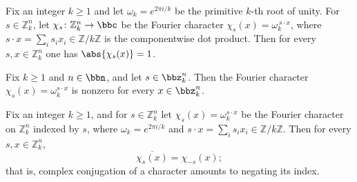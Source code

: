\begin{lemma}
\label{ZkFourier.norm_char_s}
\leanok
{}
Fix an integer $k \ge 1$ and let $\omega_k = e^{2\pi i/k}$ be the primitive $k$-th root
of unity. For $s \in \mathbb{Z}_k^n$, let $\chi_s \colon \mathbb{Z}_k^n \to \bbc$ be the
Fourier character $\chi_s(x) = \omega_k^{\,s\cdot x}$, where $s \cdot x = \sum_{i} s_i
x_i \in \mathbb{Z}/k\mathbb{Z}$ is the componentwise dot product. Then for every $s, x
\in \mathbb{Z}_k^n$ one has $\abs{\chi_s(x)} = 1$.
\end{lemma}

\begin{lemma}
\label{ZkFourier.char_s_ne_zero}
\leanok
{}
Fix $k \geq 1$ and $n \in \bbn$, and let $s \in \bbz_k^n$. Then the Fourier character
$\chi_s(x) = \omega_k^{s \cdot x}$ is nonzero for every $x \in \bbz_k^n$.
\end{lemma}

\begin{lemma}
\label{ZkFourier.char_s_conj}
\leanok
{}
Fix an integer $k \ge 1$, and for $s \in \mathbb{Z}_k^n$ let $\chi_s(x) = \omega_k^{s
\cdot x}$ be the Fourier character on $\mathbb{Z}_k^n$ indexed by $s$, where $\omega_k =
e^{2\pi i/k}$ and $s \cdot x = \sum_{i} s_i x_i \in \mathbb{Z}/k\mathbb{Z}$. Then for
every $s, x \in \mathbb{Z}_k^n$,
\[
\overline{\chi_s(x)} = \chi_{-s}(x);
\]
that is, complex conjugation of a character amounts to negating its index.
\end{lemma}

